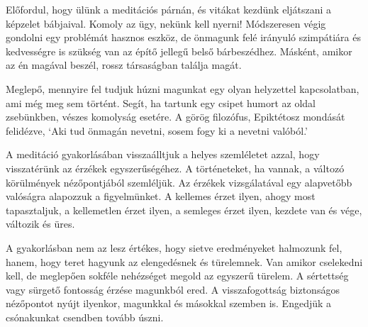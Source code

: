 Előfordul, hogy ülünk a meditációs párnán, és vitákat kezdünk eljátszani
a képzelet bábjaival. Komoly az ügy, nekünk kell nyerni! Módszeresen
végig gondolni egy problémát hasznos eszköz, de önmagunk felé irányuló
szimpátiára és kedvességre is szükség van az építő jellegű belső
bárbeszédhez. Másként, amikor az én magával beszél, rossz társaságban
találja magát.


Meglepő, mennyire fel tudjuk húzni magunkat egy olyan helyzettel
kapcsolatban, ami még meg sem történt. Segít, ha tartunk egy csipet
humort az oldal zsebünkben, vészes komolyság esetére. A görög filozófus,
Epiktétosz mondását felidézve, `Aki tud önmagán nevetni, sosem fogy ki a
nevetni valóból.'


A meditáció gyakorlásában visszaálltjuk a helyes szemléletet azzal, hogy
visszatérünk az érzékek egyszerűségéhez. A történeteket, ha vannak, a
változó körülmények nézőpontjából szemléljük. Az érzékek vizsgálatával
egy alapvetőbb valóságra alapozzuk a figyelmünket. A kellemes érzet
ilyen, ahogy most tapasztaljuk, a kellemetlen érzet ilyen, a semleges
érzet ilyen, kezdete van és vége, változik és üres.

A gyakorlásban nem az lesz értékes, hogy sietve eredményeket halmozunk
fel, hanem, hogy teret hagyunk az elengedésnek és türelemnek. Van amikor
cselekedni kell, de meglepően sokféle nehézséget megold az egyszerű
türelem. A sértettség vagy sürgető fontosság érzése magunkból ered. A
visszafogottság biztonságos nézőpontot nyújt ilyenkor, magunkkal és
másokkal szemben is. Engedjük a csónakunkat csendben tovább úszni.
